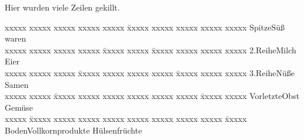 \documentclass[a4paper, pdftex, ngerman, 11pt]{article}
\begin{document}
Hier wurden viele Zeilen gekillt.\\

\begin{tabbing}

xxxxx xxxxx xxxxx xxxxx xxxxx \= xxxxx xxxxx xxxxx xxxxx xxxxx\kill
Spitze\>Süß waren\\
xxxxx xxxxx xxxxx xxxxx \= xxxxx xxxxx \= xxxxx xxxxx xxxxx xxxxx\kill
2.Reihe\>Milch \>Eier\\
xxxxx xxxxx xxxxx \= xxxxx xxxxx xxxxx xxxxx \= xxxxx xxxxx xxxxx\kill
3.Reihe\>Nüße \>Samen\\
xxxxx xxxxx \= xxxxx xxxxx xxxxx xxxxx xxxxx xxxxx \= xxxxx xxxxx\kill
Vorletzte\>Obst \>Gemüse\\
xxxxx \= xxxxx xxxxx xxxxx xxxxx xxxxx xxxxx xxxxx xxxxx \= xxxxx\kill
Boden\>Vollkornprodukte \>Hülsenfrüchte\\
\end{tabbing}
\end{document}
